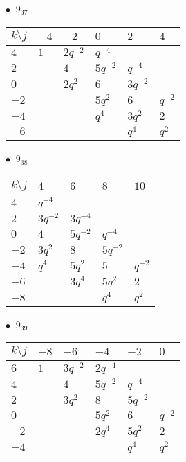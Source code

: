 %
\begin{minipage}{\linewidth}
$\bullet\ $ $9_{37}$ \vspace{0.5em} \\
\begin{tabular}{l|lllll}
$k \setminus j$ & $-4$ & $-2$ & $0$ & $2$ & $4$ \\
\hline
$4$ & $1$ & $2q^{-2}$ & $q^{-4}$ &  &  \\
$2$ &  & $4$ & $5q^{-2}$ & $q^{-4}$ &  \\
$0$ &  & $2q^{2}$ & $6$ & $3q^{-2}$ &  \\
$-2$ &  &  & $5q^{2}$ & $6$ & $q^{-2}$ \\
$-4$ &  &  & $q^{4}$ & $3q^{2}$ & $2$ \\
$-6$ &  &  &  & $q^{4}$ & $q^{2}$ \\
\end{tabular}
\vspace{2em}
\end{minipage}
%
\begin{minipage}{\linewidth}
$\bullet\ $ $9_{38}$ \vspace{0.5em} \\
\begin{tabular}{l|llll}
$k \setminus j$ & $4$ & $6$ & $8$ & $10$ \\
\hline
$4$ & $q^{-4}$ &  &  &  \\
$2$ & $3q^{-2}$ & $3q^{-4}$ &  &  \\
$0$ & $4$ & $5q^{-2}$ & $q^{-4}$ &  \\
$-2$ & $3q^{2}$ & $8$ & $5q^{-2}$ &  \\
$-4$ & $q^{4}$ & $5q^{2}$ & $5$ & $q^{-2}$ \\
$-6$ &  & $3q^{4}$ & $5q^{2}$ & $2$ \\
$-8$ &  &  & $q^{4}$ & $q^{2}$ \\
\end{tabular}
\vspace{2em}
\end{minipage}
%
\begin{minipage}{\linewidth}
$\bullet\ $ $9_{39}$ \vspace{0.5em} \\
\begin{tabular}{l|lllll}
$k \setminus j$ & $-8$ & $-6$ & $-4$ & $-2$ & $0$ \\
\hline
$6$ & $1$ & $3q^{-2}$ & $2q^{-4}$ &  &  \\
$4$ &  & $4$ & $5q^{-2}$ & $q^{-4}$ &  \\
$2$ &  & $3q^{2}$ & $8$ & $5q^{-2}$ &  \\
$0$ &  &  & $5q^{2}$ & $6$ & $q^{-2}$ \\
$-2$ &  &  & $2q^{4}$ & $5q^{2}$ & $2$ \\
$-4$ &  &  &  & $q^{4}$ & $q^{2}$ \\
\end{tabular}
\vspace{2em}
\end{minipage}
